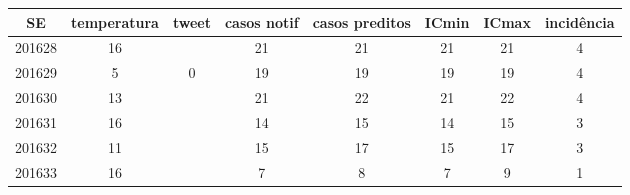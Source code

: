 \begin{tabular}{c|ccccccc}
  \hline
SE & temperatura & tweet & casos notif & casos preditos & ICmin & ICmax & incidência \\ 
  \hline
201628 & 16 &  & 21 & 21 & 21 & 21 & 4 \\ 
  201629 & 5 & 0 & 19 & 19 & 19 & 19 & 4 \\ 
  201630 & 13 &  & 21 & 22 & 21 & 22 & 4 \\ 
  201631 & 16 &  & 14 & 15 & 14 & 15 & 3 \\ 
  201632 & 11 &  & 15 & 17 & 15 & 17 & 3 \\ 
  201633 & 16 &  & 7 & 8 & 7 & 9 & 1 \\ 
   \hline
\end{tabular}
